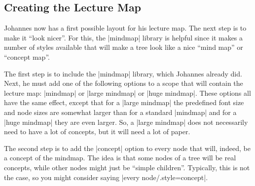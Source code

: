 \subsection{Creating the Lecture Map}

Johannes now has a first possible layout for his lecture map. The next step is
to make it ``look nicer''. For this, the |mindmap| library is helpful since it
makes a number of styles available that will make a tree look like a nice
``mind map'' or ``concept map''.

The first step is to include the |mindmap| library, which Johannes already did.
Next, he must add one of the following options to a scope that will contain the
lecture map: |mindmap| or |large mindmap| or |huge mindmap|. These options all
have the same effect, except that for a |large mindmap| the predefined font
size and node sizes are somewhat larger than for a standard |mindmap| and for a
|huge mindmap| they are even larger. So, a |large mindmap| does not necessarily
need to have a lot of concepts, but it will need a lot of paper.

The second step is to add the |concept| option to every node that will, indeed,
be a concept of the mindmap. The idea is that some nodes of a tree will be real
concepts, while other nodes might just be ``simple children''. Typically, this
is not the case, so you might consider saying |every node/.style=concept|.

